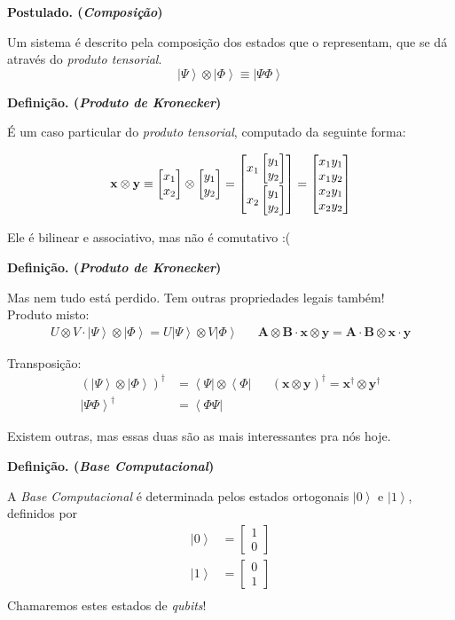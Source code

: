 \documentclass[t]{beamer}
\newcommand{\postulado}[1]{%
	\textbf{Postulado. (\emph{#1})\\}
}
\newcommand{\definicao}[1]{%
	\textbf{Definição. (\emph{#1})\\}
}
\newcommand{\vetor}[2]{\ensuremath{
\left[\begin{matrix}
#1 \\
#2
\end{matrix}\right]
}
}
\newcommand{\vetorx}[4]{\ensuremath{
\left[\begin{matrix}
#1 \\
#2 \\
#3 \\
#4
\end{matrix}\right]
}
}
\newcommand{\ket}[1]{\ensuremath{\left|#1\right\rangle}}
\newcommand{\bra}[1]{\ensuremath{\left\langle#1\right|}}
\begin{document}
	\begin{frame}{\subsecname}
		\postulado{Composição}
		Um sistema é descrito pela composição dos estados que o representam, que se dá através do \emph{produto tensorial}.
		$$\ket{\Psi} \otimes \ket{\Phi} \equiv \ket{\Psi\Phi}$$
	\end{frame}
	
	\begin{frame}{\subsecname}
		\definicao{Produto de Kronecker}
		
		É um caso particular do \emph{produto tensorial}, computado da seguinte forma:
		
		\begin{align*}
		\mathbf{x} \otimes \mathbf{y} \equiv \vetor{x_1}{x_2} \otimes \vetor{y_1}{y_2} = \vetor{x_1 \vetor{y_1}{y_2} \vspace{2pt}}{x_2 \vetor{y_1}{y_2}} = \vetorx{x_1 y_1}{x_1 y_2}{x_2 y_1 }{x_2 y_2}
		\end{align*}
		
		Ele é bilinear e associativo, mas não é comutativo :(\\
	\end{frame}
	
	\begin{frame}{\subsecname}
		\definicao{Produto de Kronecker}
		
		Mas nem tudo está perdido. Tem outras propriedades legais também!\\
		
		Produto misto:
		\begin{align*}
			U \otimes V \cdot \ket{\Psi} \otimes \ket{\Phi} = U \ket{\Psi} \otimes V \ket{\Phi} && \mathbf{A} \otimes \mathbf{B} \cdot \mathbf{x} \otimes \mathbf{y} = \mathbf{A} \cdot \mathbf{B} \otimes \mathbf{x} \cdot \mathbf{y}
		\end{align*}
		
		Transposição:
		\begin{align*}
			(\ket{\Psi} \otimes \ket{\Phi})^\dagger &= \bra{\Psi} \otimes \bra{\Phi} && (\mathbf{x} \otimes \mathbf{y})^\dagger = \mathbf{x}^\dagger \otimes \mathbf{y}^\dagger\\
			\ket{\Psi\Phi}^\dagger &= \bra{\Phi\Psi} &&
		\end{align*}
		
		Existem outras, mas essas duas são as mais interessantes pra nós hoje.
	\end{frame}
	
	\begin{frame}{\subsecname}
		\definicao{Base Computacional}
		A \emph{Base Computacional} é determinada pelos estados ortogonais $\ket{0}$ e $\ket{1}$, definidos por
		\begin{align*}
		\ket{0} &= \vetor{1}{0}\\
		\ket{1} &= \vetor{0}{1}\\
		\end{align*}
		Chamaremos estes estados de \textit{qubits}!
	\end{frame}
	
\end{document}
